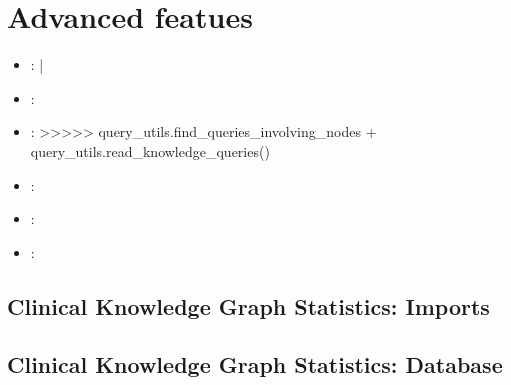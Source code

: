 \documentclass[letterpaper,10pt,english]{sphinxmanual}
\begin{document}
\chapter{Advanced featues}
\label{\detokenize{index:advanced-featues}}\begin{itemize}
\item {} 
:
{\hyperref[\detokenize{advanced_features/import-statistics::doc}]{}} |
{\hyperref[\detokenize{advanced_features/graphdb-statistics::doc}]{}}

\item {} 
:
{\hyperref[\detokenize{advanced_features/ckg-notebooks::doc}]{}}

\item {} 
:
{\hyperref[\detokenize{advanced_features/ckg-queries::doc}]{}}  \textgreater{}\textgreater{}\textgreater{}\textgreater{}\textgreater{} query\_utils.find\_queries\_involving\_nodes + query\_utils.read\_knowledge\_queries()

\item {} 
:
{\hyperref[\detokenize{advanced_features/standard-analysis::doc}]{}}

\item {} 
:
{\hyperref[\detokenize{advanced_features/visualization-plots::doc}]{}}

\item {} 
:
{\hyperref[\detokenize{advanced_features/R-interface::doc}]{}}

\end{itemize}


\section{Clinical Knowledge Graph Statistics: Imports}
\label{\detokenize{advanced_features/import-statistics:clinical-knowledge-graph-statistics-imports}}\label{\detokenize{advanced_features/import-statistics::doc}}

\section{Clinical Knowledge Graph Statistics: Database}
\label{\detokenize{advanced_features/graphdb-statistics:clinical-knowledge-graph-statistics-database}}\label{\detokenize{advanced_features/graphdb-statistics::doc}}
\end{document}
